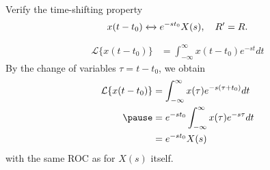 \begin{frame}{}
    \begin{example}
        Verify the time-shifting property
        \begin{equation*}
            x(t-t_0) \xleftrightarrow{} e^{-st_0}X(s), \quad R^\prime = R.
        \end{equation*}
    \end{example}
    \pause
    {
        \begin{align*}
            \mathcal{L}\{x(t-t_0)\}    &= \int_{-\infty}^\infty x(t-t_0)e^{-st}dt
        \end{align*}
        By the change of variables $\tau=t-t_0$, we obtain\pause
        \begin{align*}
            \mathcal{L}\{x(t-t_0)\}    &= \int_{-\infty}^\infty x(\tau)e^{-s(\tau+t_0)}dt\\
            \pause
            &= e^{-st_0}\int_{-\infty}^\infty x(\tau)e^{-s\tau}dt\\
            &= e^{-st_0}X(s)
        \end{align*}
        with the same ROC as for $X(s)$ itself.
    }
\end{frame}

